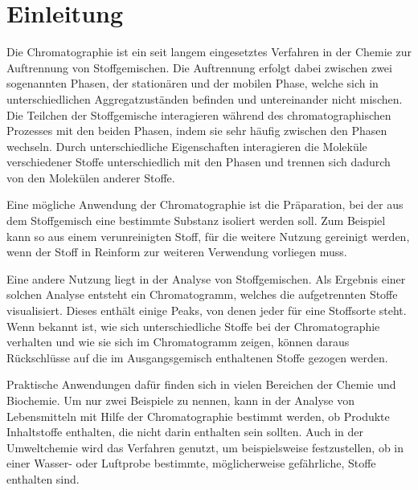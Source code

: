 \label{chapter:ein}

\chapter{Einleitung}


Die Chromatographie ist ein seit langem eingesetztes Verfahren in der Chemie zur Auftrennung von Stoffgemischen. 
Die Auftrennung erfolgt dabei zwischen zwei sogenannten Phasen, der stationären und der mobilen Phase, welche sich in unterschiedlichen Aggregatzuständen befinden und untereinander nicht mischen. Die Teilchen der Stoffgemische interagieren während des chromatographischen Prozesses mit den beiden Phasen, indem sie sehr häufig zwischen den Phasen wechseln. Durch unterschiedliche Eigenschaften interagieren die Moleküle verschiedener Stoffe unterschiedlich mit den Phasen und trennen sich dadurch von den Molekülen anderer Stoffe. 

Eine mögliche Anwendung der Chromatographie ist die Präparation, bei der aus dem Stoffgemisch eine bestimmte Substanz isoliert werden soll. Zum Beispiel kann so aus einem verunreinigten Stoff, für die weitere Nutzung gereinigt werden, wenn der Stoff in Reinform zur weiteren Verwendung vorliegen muss.

Eine andere Nutzung liegt in der Analyse von Stoffgemischen. Als Ergebnis einer solchen Analyse entsteht ein Chromatogramm, welches die aufgetrennten Stoffe visualisiert. Dieses enthält einige Peaks, von denen jeder für eine Stoffsorte steht. Wenn bekannt ist, wie sich unterschiedliche Stoffe bei der Chromatographie verhalten und wie sie sich im Chromatogramm zeigen, können daraus Rückschlüsse auf die im Ausgangsgemisch enthaltenen Stoffe gezogen werden. 

Praktische Anwendungen dafür finden sich in vielen Bereichen der Chemie und Biochemie. 
Um nur zwei Beispiele zu nennen, kann in der Analyse von Lebensmitteln mit Hilfe der Chromatographie bestimmt werden, ob Produkte Inhaltstoffe enthalten,  die nicht darin enthalten sein sollten. Auch in der Umweltchemie wird das Verfahren genutzt, um beispielsweise festzustellen, ob in einer Wasser- oder Luftprobe bestimmte, möglicherweise gefährliche, Stoffe enthalten sind.

